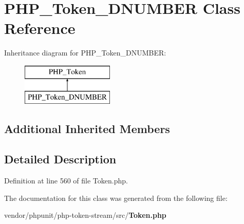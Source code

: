 \section{P\+H\+P\+\_\+\+Token\+\_\+\+D\+N\+U\+M\+B\+E\+R Class Reference}
\label{class_p_h_p___token___d_n_u_m_b_e_r}
Inheritance diagram for P\+H\+P\+\_\+\+Token\+\_\+\+D\+N\+U\+M\+B\+E\+R\+:\begin{figure}[H]
\begin{center}
\leavevmode
\includegraphics[height=2.000000cm]{class_p_h_p___token___d_n_u_m_b_e_r}
\end{center}
\end{figure}
\subsection*{Additional Inherited Members}


\subsection{Detailed Description}


Definition at line 560 of file Token.\+php.



The documentation for this class was generated from the following file\+:\begin{DoxyCompactItemize}
\item 
vendor/phpunit/php-\/token-\/stream/src/{\bf Token.\+php}\end{DoxyCompactItemize}
